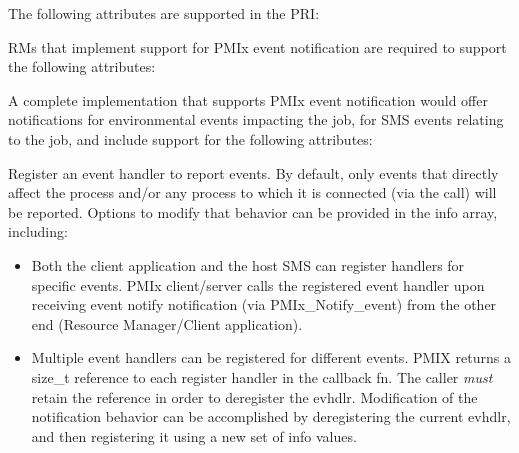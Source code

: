 \priattr
The following attributes are supported in the \ac{PRI}:


\reqattr
\acp{RM} that implement support for PMIx event notification are required to support the following attributes:


\optattr
A complete implementation that supports \ac{PMIx} event notification would offer notifications for environmental events impacting the job, for \ac{SMS} events relating to the job, and include support for the following attributes:



\descr

Register an event handler to report events. By default, only events that directly affect the process and/or any process to which it is connected (via the  call) will be reported. Options to modify that behavior can be provided in the info array, including:

\begin{itemize}

\item Both the client application and the host \ac{SMS} can register handlers for specific events. \ac{PMIx} client/server calls the registered event handler upon receiving event notify notification (via PMIx_Notify_event) from the other end (Resource Manager/Client application).

\item Multiple event handlers can be registered for different events. PMIX returns a size_t reference to each register handler in the callback fn. The caller \textit{must} retain the reference in order to deregister the evhdlr. Modification of the notification behavior can be accomplished by deregistering the current evhdlr, and then registering it using a new set of info values.
\end{itemize}

